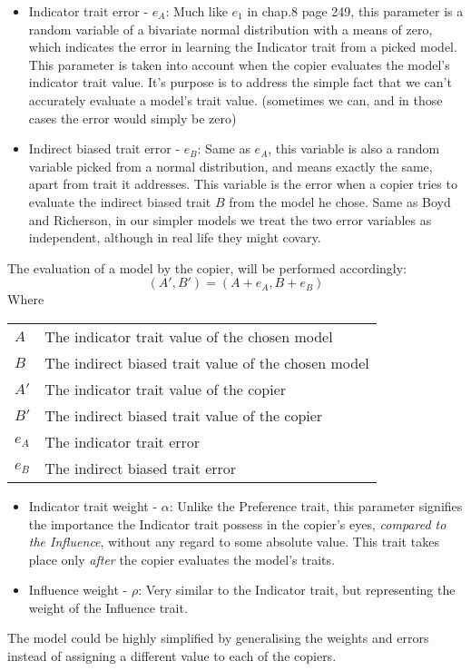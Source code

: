 \documentclass[11pt]{article}
\makeatletter
\newenvironment{conditions}
  {\par\vspace{\abovedisplayskip}\noindent\begin{tabular}{>{$}l<{$} @{${}={}$} l}}
  {\end{tabular}\par\vspace{\belowdisplayskip}}
\makeatother
\begin{document}
\begin{itemize}
  \item Indicator trait error - $e_{A}$: Much like $e_{1}$ in \cite{evolutionBook} chap.8 page 249, this parameter is a random variable of a bivariate normal distribution with a means of zero, which indicates the error in learning the Indicator trait from a picked model.
   This parameter is taken into account when the copier evaluates the model's indicator trait value. It's purpose is to address the simple fact that we can't accurately evaluate a model's trait value. (sometimes we can, and in those cases the error would simply be zero)
  
  \item Indirect biased trait error - $e_{B}$: Same as $e_{A}$, this variable is also a random variable picked from a normal distribution, and means exactly the same, apart from trait it addresses. This variable is the error when a copier tries to evaluate the indirect biased trait $B$ from the model he chose. Same as Boyd and Richerson, in our simpler models we treat the two error variables as independent, although in real life they might covary.
  \end{itemize}
  
  The evaluation of a model by the copier, will be performed accordingly:
  \begin{equation}\label{transmission}
	(A',B') = (A + e_{A}, B + e_{B})
 \end{equation}
 Where
 \begin{conditions}
A & The indicator trait value of the chosen model \\
B & The indirect biased trait value of the chosen model \\
A' & The indicator trait value of the copier \\
B' & The indirect biased trait value of the copier \\
e_{A} & The indicator trait error \\
e_{B} & The indirect biased trait error
 \end{conditions}
  
  \begin{itemize}
  \item Indicator trait weight - $\alpha$: Unlike the Preference trait, this parameter signifies the importance the Indicator trait possess in the copier's eyes, \textit{compared to the Influence}, without any regard to some absolute value. This trait takes place only \textit{after} the copier evaluates the model's traits. 
  \item Influence weight - $\rho$: Very similar to the Indicator trait, but representing the weight of the Influence trait.
  \end{itemize} 
    The model could be highly simplified by generalising the weights and errors instead of assigning a different value to each of the copiers.
\end{document}
